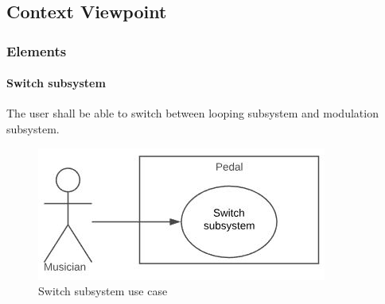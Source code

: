 \subsection{Context Viewpoint}
    
        
    \subsubsection{Elements}
        \paragraph{Switch subsystem}
           The user shall be able to switch between looping subsystem and modulation subsystem.
          
                \begin{figure}[!ht]
                    \centering
                    \includegraphics[width=.5\textwidth]{diagrams/use_cases/uc-switch.JPG}
                    \caption{Switch subsystem use case}
                    \label{fig:uc-switch}
                \end{figure}
            
